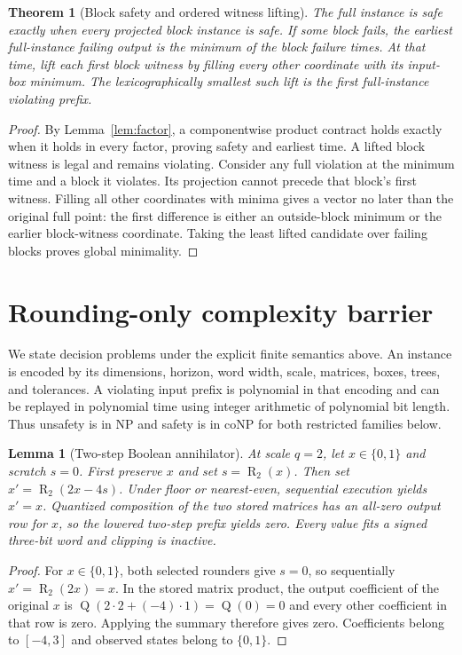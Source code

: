 \documentclass[11pt]{article}
\newtheorem{lemma}[definition]{Lemma}
\newtheorem{theorem}[definition]{Theorem}
\newcommand{\R}{\operatorname{R}}
\newcommand{\Q}{\operatorname{Q}}
\begin{document}
\begin{theorem}[Block safety and ordered witness lifting]\label{thm:block}
The full instance is safe exactly when every projected block instance is safe. If some block fails, the earliest full-instance failing output is the minimum of the block failure times. At that time, lift each first block witness by filling every other coordinate with its input-box minimum. The lexicographically smallest such lift is the first full-instance violating prefix.
\end{theorem}
\begin{proof}
By Lemma~\ref{lem:factor}, a componentwise product contract holds exactly when it holds in every factor, proving safety and earliest time. A lifted block witness is legal and remains violating. Consider any full violation at the minimum time and a block it violates. Its projection cannot precede that block's first witness. Filling all other coordinates with minima gives a vector no later than the original full point: the first difference is either an outside-block minimum or the earlier block-witness coordinate. Taking the least lifted candidate over failing blocks proves global minimality.
\end{proof}

\section{Rounding-only complexity barrier}
We state decision problems under the explicit finite semantics above. An instance is encoded by its dimensions, horizon, word width, scale, matrices, boxes, trees, and tolerances. A violating input prefix is polynomial in that encoding and can be replayed in polynomial time using integer arithmetic of polynomial bit length. Thus unsafety is in NP and safety is in coNP for both restricted families below.

\begin{lemma}[Two-step Boolean annihilator]\label{lem:annihilator}
At scale $q=2$, let $x\in\{0,1\}$ and scratch $s=0$. First preserve $x$ and set $s=\R_2(x)$. Then set $x'=\R_2(2x-4s)$. Under floor or nearest-even, sequential execution yields $x'=x$. Quantized composition of the two stored matrices has an all-zero output row for $x$, so the lowered two-step prefix yields zero. Every value fits a signed three-bit word and clipping is inactive.
\end{lemma}
\begin{proof}
For $x\in\{0,1\}$, both selected rounders give $s=0$, so sequentially $x'=\R_2(2x)=x$. In the stored matrix product, the output coefficient of the original $x$ is $\Q(2\cdot2+(-4)\cdot1)=\Q(0)=0$ and every other coefficient in that row is zero. Applying the summary therefore gives zero. Coefficients belong to $[-4,3]$ and observed states belong to $\{0,1\}$.
\end{proof}
\end{document}
